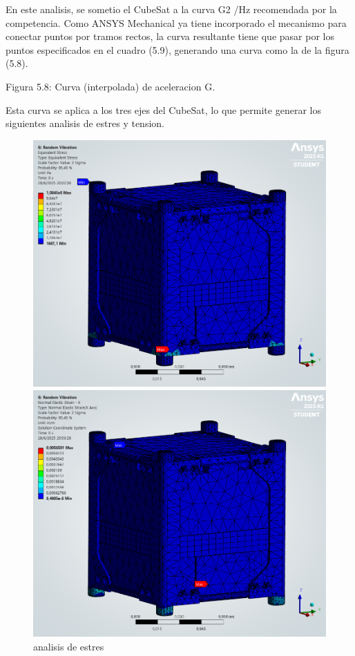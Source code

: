       En este analisis, se sometio el CubeSat a la curva G2 /Hz recomendada por la competencia. Como
      ANSYS Mechanical ya tiene incorporado el mecanismo para conectar puntos por
      tramos rectos, la curva resultante tiene que pasar por los puntos especificados en el cuadro
      (5.9), generando una curva como la de la figura (5.8).


      Figura 5.8: Curva (interpolada) de aceleracion G.

      Esta curva se aplica a los tres ejes del CubeSat, lo que permite generar los siguientes
      analisis de estres y tension.

      \begin{figure}[h]
        \begin{minipage}{0.5\textwidth}
          \centering
          \includegraphics[width=\textwidth]{image/fem/ansys_cubesat-vibration_stress.png}
          \caption{analisis de estres}
          \label{fig:fem_stress}
        \end{minipage}
        \begin{minipage}{0.5\textwidth}
          \centering
          \includegraphics[width=\textwidth]{image/fem/ansys_cubesat-vibration_strain-x.png}

\end{minipage}
\end{figure}
